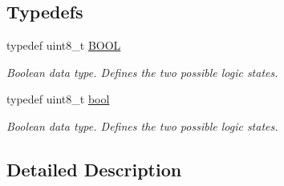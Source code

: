 \subsection*{Typedefs}
\begin{DoxyCompactItemize}
\item 
\hypertarget{group__data__types_gad2f8ed01c1733d4eab0932d970abaa4c}{typedef uint8\-\_\-t \hyperlink{group__data__types_gad2f8ed01c1733d4eab0932d970abaa4c}{B\-O\-O\-L}}\label{group__data__types_gad2f8ed01c1733d4eab0932d970abaa4c}

\begin{DoxyCompactList}\small\item\em Boolean data type. Defines the two possible logic states. \end{DoxyCompactList}\item 
\hypertarget{group__data__types_ga0ecf26b576b9a54eca656b9be7ba6a06}{typedef uint8\-\_\-t \hyperlink{group__data__types_ga0ecf26b576b9a54eca656b9be7ba6a06}{bool}}\label{group__data__types_ga0ecf26b576b9a54eca656b9be7ba6a06}

\begin{DoxyCompactList}\small\item\em Boolean data type. Defines the two possible logic states. \end{DoxyCompactList}\end{DoxyCompactItemize}


\subsection{Detailed Description}
